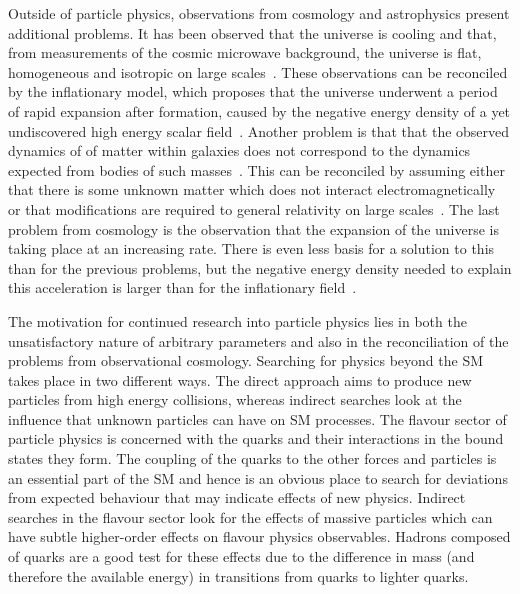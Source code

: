 Outside of particle physics, observations from cosmology and astrophysics present additional problems.
It has been observed that the universe is cooling and 
that, from measurements of the cosmic microwave background, 
the universe is flat, homogeneous and isotropic on large scales~\cite{Bennett:2012zja}.
These observations can be reconciled by the inflationary model, which proposes that 
the universe underwent a period of rapid expansion after formation, caused by the negative energy density
 of a yet undiscovered high energy scalar field~\cite{Dodelson:2003ft}.
Another problem is that that the observed dynamics of of matter within galaxies 
does not correspond to the dynamics expected from bodies of such masses~\cite{DMDISC}.
This can be reconciled by assuming either that there is some unknown matter which does not interact electromagnetically
 or that modifications are required to general relativity on large scales~\cite{D'Amico:2009df,Famaey:2011kh}.
The last problem from cosmology is the observation that the expansion of the universe is taking place at an increasing rate. 
There is even less basis for a solution to this than for the previous problems, but the 
negative energy density needed to explain this acceleration is larger than for the inflationary field~\cite{Martin:2012bt}.

The motivation for continued research into particle physics lies in both the unsatisfactory nature of arbitrary parameters 
and also in the reconciliation of the problems from observational cosmology.
Searching for physics beyond the SM takes place in two different ways. 
The direct approach aims to produce new particles from high energy collisions, whereas indirect searches look at
the influence that unknown particles can have on SM processes. 
The flavour sector of particle physics is concerned with the quarks and their interactions in the bound states they form.
The coupling of the quarks to the other forces and particles is an essential part of the SM and hence is 
an obvious place to search for deviations from expected behaviour that may indicate effects of new physics.
Indirect searches in the flavour sector look for the effects of massive particles which can have subtle higher-order effects on 
flavour physics observables.
Hadrons composed of \bquark quarks are a good test for these effects due to the difference in mass (and therefore 
the available energy) in transitions from \bquark quarks to lighter quarks.

